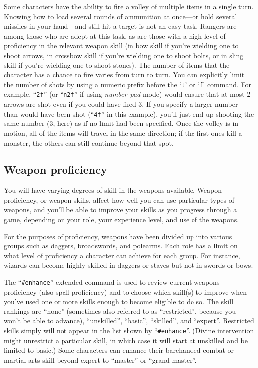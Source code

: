 Some characters have the ability to fire a volley of multiple items in a
single turn.  Knowing how to load several rounds of ammunition at
once---or hold several missiles in your hand---and still hit a
target is not an easy task.  Rangers are among those who are adept
at this task, as are those with a high level of proficiency in the
relevant weapon skill (in bow skill if you're wielding one to
shoot arrows, in crossbow skill if you're wielding one to shoot bolts,
or in sling skill if you're wielding one to shoot stones).
The number of items that the character has a chance to fire varies from
turn to turn.  You can explicitly limit the number of shots by using a
numeric prefix before the `{\tt t}' or `{\tt f}' command.
For example, ``{\tt 2f}'' (or ``{\tt n2f}'' if using
{\it number\verb+_+pad\/}
mode) would ensure that at most 2 arrows are shot
even if you could have fired 3.  If you specify
a larger number than would have been shot (``{\tt 4f}'' in this example),
you'll just end up shooting the same number (3, here) as if no limit
had been specified.  Once the volley is in motion, all of the items
will travel in the same direction; if the first ones kill a monster,
the others can still continue beyond that spot.

\subsection*{Weapon proficiency}

You will have varying degrees of skill in the weapons available.
Weapon proficiency, or weapon skills, affect how well you can use
particular types of weapons, and you'll be able to improve your skills
as you progress through a game, depending on your role, your experience
level, and use of the weapons.

For the purposes of proficiency, weapons have
been divided up into various groups such as daggers, broadswords, and
polearms.  Each role has a limit on what level of proficiency a character
can achieve for each group.  For instance, wizards can become highly
skilled in daggers or staves but not in swords or bows.

The ``{\tt \#enhance}'' extended command is used to review current weapons
proficiency
(also spell proficiency) and to choose which skill(s) to improve when
you've used one or more skills enough to become eligible to do so.  The
skill rankings are ``none'' (sometimes also referred to as ``restricted'',
because you won't be able to advance), ``unskilled'', ``basic'', ``skilled'',
and ``expert''.  Restricted skills simply will not appear in the list
shown by ``{\tt \#enhance}''.
(Divine intervention might unrestrict a particular
skill, in which case it will start at unskilled and be limited to basic.)
Some characters can enhance their barehanded combat or martial arts skill
beyond expert to ``master'' or ``grand master''.


